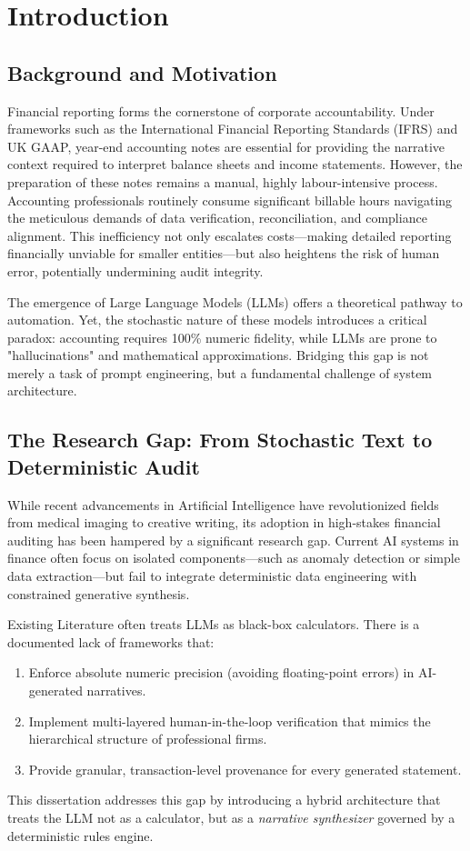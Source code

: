 \chapter{Introduction}
\label{chap:introduction}

\section{Background and Motivation}
Financial reporting forms the cornerstone of corporate accountability. Under frameworks such as the International Financial Reporting Standards (IFRS) and UK GAAP, year-end accounting notes are essential for providing the narrative context required to interpret balance sheets and income statements. However, the preparation of these notes remains a manual, highly labour-intensive process. Accounting professionals routinely consume significant billable hours navigating the meticulous demands of data verification, reconciliation, and compliance alignment. This inefficiency not only escalates costs—making detailed reporting financially unviable for smaller entities—but also heightens the risk of human error, potentially undermining audit integrity.

The emergence of Large Language Models (LLMs) offers a theoretical pathway to automation. Yet, the stochastic nature of these models introduces a critical paradox: accounting requires 100\% numeric fidelity, while LLMs are prone to "hallucinations" and mathematical approximations. Bridging this gap is not merely a task of prompt engineering, but a fundamental challenge of system architecture.

\section{The Research Gap: From Stochastic Text to Deterministic Audit}
While recent advancements in Artificial Intelligence have revolutionized fields from medical imaging to creative writing, its adoption in high-stakes financial auditing has been hampered by a significant research gap. Current AI systems in finance often focus on isolated components—such as anomaly detection or simple data extraction—but fail to integrate deterministic data engineering with constrained generative synthesis. 

Existing Literature often treats LLMs as black-box calculators. There is a documented lack of frameworks that:
\begin{enumerate}
    \item Enforce absolute numeric precision (avoiding floating-point errors) in AI-generated narratives.
    \item Implement multi-layered human-in-the-loop verification that mimics the hierarchical structure of professional firms.
    \item Provide granular, transaction-level provenance for every generated statement.
\end{enumerate}
This dissertation addresses this gap by introducing a hybrid architecture that treats the LLM not as a calculator, but as a \textit{narrative synthesizer} governed by a deterministic rules engine.

